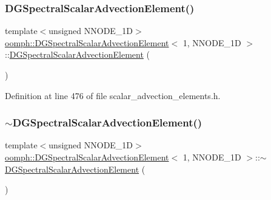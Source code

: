 \subsubsection{\texorpdfstring{D\+G\+Spectral\+Scalar\+Advection\+Element()}{DGSpectralScalarAdvectionElement()}}
{\footnotesize\ttfamily template$<$unsigned N\+N\+O\+D\+E\+\_\+1D$>$ \\
\hyperlink{classoomph_1_1DGSpectralScalarAdvectionElement}{oomph\+::\+D\+G\+Spectral\+Scalar\+Advection\+Element}$<$ 1, N\+N\+O\+D\+E\+\_\+1D $>$\+::\hyperlink{classoomph_1_1DGSpectralScalarAdvectionElement}{D\+G\+Spectral\+Scalar\+Advection\+Element} (\begin{DoxyParamCaption}{ }\end{DoxyParamCaption})\hspace{0.3cm}{\ttfamily [inline]}}



Definition at line 476 of file scalar\+\_\+advection\+\_\+elements.\+h.

\mbox{\label{classoomph_1_1DGSpectralScalarAdvectionElement_3_011_00_01NNODE__1D_01_4_a4a3ab08fb4a06976a07c6cf8df7affb5}} 
\subsubsection{\texorpdfstring{$\sim$\+D\+G\+Spectral\+Scalar\+Advection\+Element()}{~DGSpectralScalarAdvectionElement()}}
{\footnotesize\ttfamily template$<$unsigned N\+N\+O\+D\+E\+\_\+1D$>$ \\
\hyperlink{classoomph_1_1DGSpectralScalarAdvectionElement}{oomph\+::\+D\+G\+Spectral\+Scalar\+Advection\+Element}$<$ 1, N\+N\+O\+D\+E\+\_\+1D $>$\+::$\sim$\hyperlink{classoomph_1_1DGSpectralScalarAdvectionElement}{D\+G\+Spectral\+Scalar\+Advection\+Element} (\begin{DoxyParamCaption}{ }\end{DoxyParamCaption})\hspace{0.3cm}{\ttfamily [inline]}}



